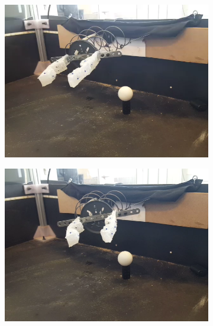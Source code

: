 \documentclass[letterpaper, 10 pt, conference]{ieeeconf}  %
\begin{document}
 \begin{figure}[h!]
        \centering
        \begin{subfigure}[b]{0.72in} 
                \centering
                \includegraphics[width=\textwidth]{figures/path/g1.png}
        \end{subfigure}
        \begin{subfigure}[b]{0.72in}                            
                \centering
                \includegraphics[width=\textwidth]{figures/path/g2.png}
        \end{subfigure}
        \begin{subfigure}[b]{0.72in} 
                \centering

\end{subfigure}
\end{figure}
\end{document}
